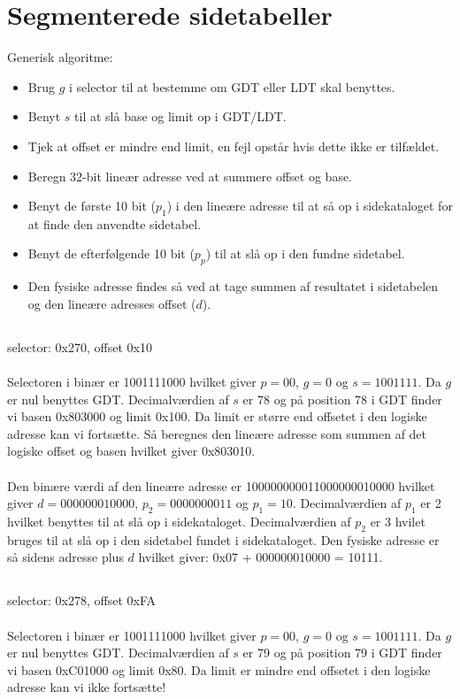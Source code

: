 \documentclass[titlepage]{article}
\begin{document}
\section{Segmenterede sidetabeller}
  Generisk algoritme:
  \begin{itemize}
    \item Brug $g$ i selector til at bestemme om GDT eller LDT skal benyttes.
    \item Benyt $s$ til at slå base og limit op i GDT/LDT.
    \item Tjek at offset er mindre end limit, en fejl opstår hvis dette ikke er tilfældet.
    \item Beregn 32-bit lineær adresse ved at summere offset og base.
    \item Benyt de første 10 bit ($p_1$) i den lineære adresse til at så op i sidekataloget for at finde den anvendte sidetabel.
    \item Benyt de efterfølgende 10 bit ($p_p$) til at slå op i den fundne sidetabel.
    \item Den fysiske adresse findes så ved at tage summen af resultatet i sidetabelen og den lineære adresses offset ($d$).
  \end{itemize}
  
  \subsection{}
    selector: 0x270, offset 0x10
    \\\\
    Selectoren i binær er 1001111000 hvilket giver $p = 00$, $g = 0$ og $s = 1001111$.
    Da $g$ er nul benyttes GDT.
    Decimalværdien af $s$ er 78 og på position 78 i GDT finder vi basen 0x803000 og limit 0x100.
    Da limit er større end offsetet i den logiske adresse kan vi fortsætte.
    Så beregnes den lineære adresse som summen af det logiske offset og basen hvilket giver 0x803010.
    \\\\
    Den binære værdi af den lineære adresse er 100000000011000000010000 hvilket giver $d = 000000010000$, $p_2 = 0000000011$ og $p_1 = 10$.
    Decimalværdien af $p_1$ er 2 hvilket benyttes til at slå op i sidekataloget.
    Decimalværdien af $p_2$ er 3 hvilet bruges til at slå op i den sidetabel fundet i sidekataloget.
    Den fysiske adresse er så sidens adresse plus $d$ hvilket giver: 0x07 + 000000010000 = 10111.
    
  \subsection{}
    selector: 0x278, offset 0xFA
    \\\\
    Selectoren i binær er 1001111000 hvilket giver $p = 00$, $g = 0$ og $s = 1001111$.
    Da $g$ er nul benyttes GDT.
    Decimalværdien af $s$ er 79 og på position 79 i GDT finder vi basen 0xC01000 og limit 0x80.
    Da limit er mindre end offsetet i den logiske adresse kan vi ikke fortsætte!
    
\end{document}
